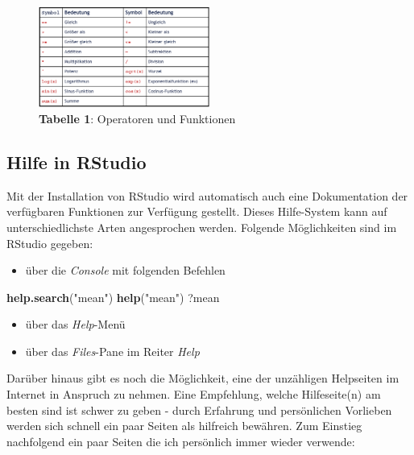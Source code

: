 \documentclass[]{article}
\newenvironment{Shaded}{\begin{snugshade}}{\end{snugshade}}
\newcommand{\KeywordTok}[1]{\textcolor[rgb]{0.13,0.29,0.53}{\textbf{#1}}}
\newcommand{\StringTok}[1]{\textcolor[rgb]{0.31,0.60,0.02}{#1}}
\newcommand{\NormalTok}[1]{#1}
\providecommand{\tightlist}{%
  \setlength{\itemsep}{0pt}\setlength{\parskip}{0pt}}
\begin{document}
\begin{figure}
\centering
\includegraphics[width=0.50000\textwidth]{Images/R_Operatoren.PNG}
\caption{\textbf{Tabelle 1}: Operatoren und Funktionen}
\end{figure}

\subsection*{Hilfe in RStudio}\label{hilfe-in-rstudio}

Mit der Installation von RStudio wird automatisch auch eine
Dokumentation der verfügbaren Funktionen zur Verfügung gestellt. Dieses
Hilfe-System kann auf unterschiedlichste Arten angesprochen werden.
Folgende Möglichkeiten sind im RStudio gegeben:

\begin{itemize}
\tightlist
\item
  über die \emph{Console} mit folgenden Befehlen
\end{itemize}

\begin{Shaded}
\begin{Highlighting}[]
\KeywordTok{help.search}\NormalTok{(}\StringTok{"mean"}\NormalTok{)}
\KeywordTok{help}\NormalTok{(}\StringTok{"mean"}\NormalTok{)}
\NormalTok{?mean}
\end{Highlighting}
\end{Shaded}

\begin{itemize}
\tightlist
\item
  über das \emph{Help}-Menü
\item
  über das \emph{Files}-Pane im Reiter \emph{Help}
\end{itemize}

Darüber hinaus gibt es noch die Möglichkeit, eine der unzähligen
Helpseiten im Internet in Anspruch zu nehmen. Eine Empfehlung, welche
Hilfeseite(n) am besten sind ist schwer zu geben - durch Erfahrung und
persönlichen Vorlieben werden sich schnell ein paar Seiten als hilfreich
bewähren. Zum Einstieg nachfolgend ein paar Seiten die ich persönlich
immer wieder verwende:
\end{document}
